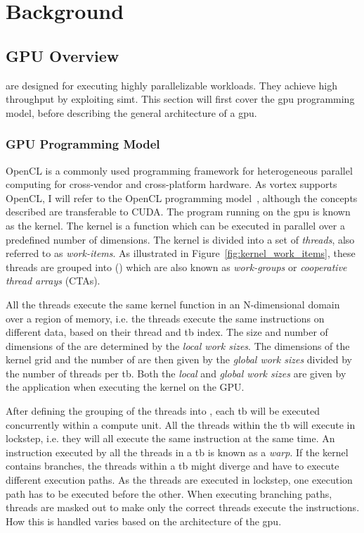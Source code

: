 \chapter{Background}

\section{GPU Overview}

 are designed for executing highly parallelizable workloads. They achieve high throughput by exploiting \acrshort{simt}. This section will first cover the \acrshort{gpu} programming model, before describing the general architecture of a \acrshort{gpu}. 

\subsection{GPU Programming Model}


OpenCL is a commonly used programming framework for heterogeneous parallel computing for cross-vendor and cross-platform hardware. As \Gls{vortex} supports OpenCL, I will refer to the OpenCL programming model~\cite{opencl_introduction}, although the concepts described are transferable to CUDA. The program running on the \acrshort{gpu} is known as the kernel. The kernel is a function which can be executed in parallel over a predefined number of dimensions. The kernel is divided into a set of \textit{threads}, also referred to as \textit{work-items}. As illustrated in Figure~\ref{fig:kernel_work_items}, these threads are grouped into \textit{} () which are also known as \textit{work-groups} or \textit{cooperative thread arrays} (CTAs).

All the threads execute the same kernel function in an N-dimensional domain over a region of memory, i.e. the threads execute the same instructions on different data, based on their thread and \acrshort{tb} index. The size and number of dimensions of the  are determined by the \textit{local work sizes}. The dimensions of the kernel grid and the number of  are then given by the \textit{global work sizes} divided by the number of threads per \acrshort{tb}. Both the \textit{local} and \textit{global work sizes} are given by the application when executing the kernel on the GPU.

After defining the grouping of the threads into , each \acrshort{tb} will be executed concurrently within a compute unit. All the threads within the \acrshort{tb} will execute in lockstep, i.e. they will all execute the same instruction at the same time. An instruction executed by all the threads in a \acrshort{tb} is known as a \textit{warp}. If the kernel contains branches, the threads within a \acrshort{tb} might diverge and have to execute different execution paths. As the threads are executed in lockstep, one execution path has to be executed before the other. When executing branching paths, threads are masked out to make only the correct threads execute the instructions. How this is handled varies based on the architecture of the \acrshort{gpu}.

